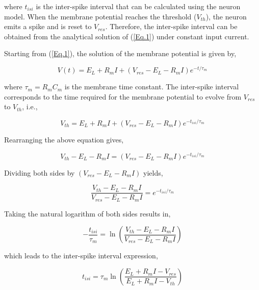 \noindent where $t_{isi}$ is the inter-spike interval that can be calculated using the neuron model. When the membrane potential reaches the threshold ($V_{th}$), the neuron emits a spike and is reset to $V_{res}$. Therefore, the inter-spike interval can be obtained from the analytical solution of (\ref{Eq.1}) under constant input current.

Starting from (\ref{Eq.1}), the solution of the membrane potential is given by,

\begin{equation}
    V(t) = E_{L} + R_{m}I + \left(V_{res} - E_{L} - R_{m}I\right)e^{-t/\tau_{m}}
\end{equation}

\noindent where $\tau_{m}=R_{m}C_{m}$ is the membrane time constant. The inter-spike interval corresponds to the time required for the membrane potential to evolve from $V_{res}$ to $V_{th}$, i.e.,

\begin{equation}
    V_{th} = E_{L} + R_{m}I + \left(V_{res} - E_{L} - R_{m}I\right)e^{-t_{isi}/\tau_{m}}
\end{equation}

\noindent Rearranging the above equation gives,

\begin{equation}
    V_{th} - E_{L} - R_{m}I = \left(V_{res} - E_{L} - R_{m}I\right)e^{-t_{isi}/\tau_{m}}
\end{equation}

\noindent Dividing both sides by $\left(V_{res} - E_{L} - R_{m}I\right)$ yields,

\begin{equation}
    \frac{V_{th} - E_{L} - R_{m}I}{V_{res} - E_{L} - R_{m}I} = e^{-t_{isi}/\tau_{m}}
\end{equation}

\noindent Taking the natural logarithm of both sides results in,

\begin{equation}
    -\frac{t_{isi}}{\tau_{m}} = \ln\left(\frac{V_{th} - E_{L} - R_{m}I}{V_{res} - E_{L} - R_{m}I}\right)
\end{equation}

\noindent which leads to the inter-spike interval expression,

\begin{equation} \label{Eq.7}
    t_{isi} = \tau_{m}\ln\left(\frac{E_{L} + R_{m}I - V_{res}}{E_{L} + R_{m}I - V_{th}}\right)
\end{equation}

